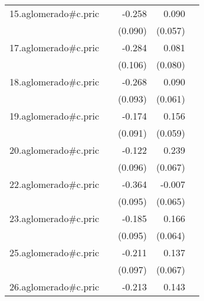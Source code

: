 {\begin{longtable}{l*{4}{D{.}{.}{-1}}}
\addlinespace
15.aglomerado#c.pric&                     &      -0.258\sym{**} &       0.090         &                     \\
            &                     &     (0.090)         &     (0.057)         &                     \\
\addlinespace
17.aglomerado#c.pric&                     &      -0.284\sym{**} &       0.081         &                     \\
            &                     &     (0.106)         &     (0.080)         &                     \\
\addlinespace
18.aglomerado#c.pric&                     &      -0.268\sym{**} &       0.090         &                     \\
            &                     &     (0.093)         &     (0.061)         &                     \\
\addlinespace
19.aglomerado#c.pric&                     &      -0.174         &       0.156\sym{**} &                     \\
            &                     &     (0.091)         &     (0.059)         &                     \\
\addlinespace
20.aglomerado#c.pric&                     &      -0.122         &       0.239\sym{***}&                     \\
            &                     &     (0.096)         &     (0.067)         &                     \\
\addlinespace
22.aglomerado#c.pric&                     &      -0.364\sym{***}&      -0.007         &                     \\
            &                     &     (0.095)         &     (0.065)         &                     \\
\addlinespace
23.aglomerado#c.pric&                     &      -0.185         &       0.166\sym{**} &                     \\
            &                     &     (0.095)         &     (0.064)         &                     \\
\addlinespace
25.aglomerado#c.pric&                     &      -0.211\sym{*}  &       0.137\sym{*}  &                     \\
            &                     &     (0.097)         &     (0.067)         &                     \\
\addlinespace
26.aglomerado#c.pric&                     &      -0.213\sym{*}  &       0.143\sym{*}  &                     \\

\end{longtable}}
